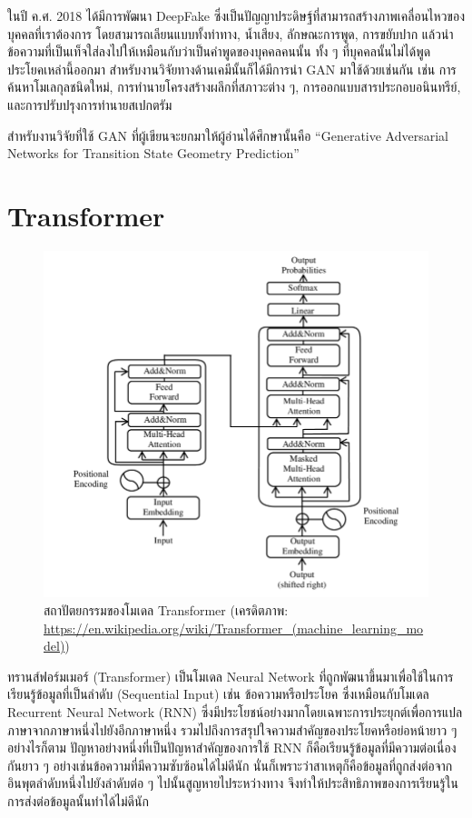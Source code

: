 ในปี ค.ศ. 2018 ได้มีการพัฒนา DeepFake ซึ่งเป็นปัญญาประดิษฐ์ที่สามารถสร้างภาพเคลื่อนไหวของบุคคลที่เราต้องการ โดยสามารถเลียนแบบทั้งท่าทาง, น้ำเสียง, ลักษณะการพูด, การขยับปาก แล้วนำข้อความที่เป็นเท็จใส่ลงไปให้เหมือนกับว่าเป็นคำพูดของบุคคลคนนั้น ทั้ง ๆ ที่บุคคลนั้นไม่ได้พูดประโยคเหล่านี้ออกมา สำหรับงานวิจัยทางด้านเคมีนั้นก็ได้มีการนำ GAN มาใช้ด้วยเช่นกัน เช่น การค้นหาโมเลกุลชนิดใหม่\autocite{prykhodko2019,lee2021,blanchard2021}, การทำนายโครงสร้างผลึกที่สภาวะต่าง ๆ\autocite{kim2020}, การออกแบบสารประกอบอนินทรีย์\autocite{dan2020}, และการปรับปรุงการทำนายสเปกตรัม\autocite{al-mualem2022}

สำหรับงานวิจัยที่ใช้ GAN ที่ผู้เขียนจะยกมาให้ผู้อ่านได้ศึกษานั้นคือ \enquote{Generative Adversarial Networks for Transition State Geometry Prediction}\autocite{makos2021}

\section{Transformer}
\label{sec:transformer}

\begin{figure}[H]
    \centering
    \includegraphics[width=0.9\linewidth]{fig/transformer.png}
    \caption{สถาปัตยกรรมของโมเดล Transformer (เครดิตภาพ: \url{https://en.wikipedia.org/wiki/Transformer_(machine_learning_model)})}
    \label{fig:transformer}
\end{figure}

ทรานส์ฟอร์มเมอร์ (Transformer)\autocite{vaswani2017a} เป็นโมเดล Neural Network ที่ถูกพัฒนาขึ้นมาเพื่อใช้ในการเรียนรู้ข้อมูลที่เป็นลำดับ (Sequential Input) เช่น ข้อความหรือประโยค ซึ่งเหมือนกับโมเดล Recurrent Neural Network (RNN) ซึ่งมีประโยชน์อย่างมากโดยเฉพาะการประยุกต์เพื่อการแปลภาษาจากภาษาหนึ่งไปยังอีกภาษาหนึ่ง รวมไปถึงการสรุปใจความสำคัญของประโยคหรือย่อหน้ายาว ๆ อย่างไรก็ตาม ปัญหาอย่างหนึ่งที่เป็นปัญหาสำคัญของการใช้ RNN ก็คือเรียนรู้ข้อมูลที่มีความต่อเนื่องกันยาว ๆ อย่างเช่นข้อความที่มีความซับซ้อนได้ไม่ดีนัก นั่นก็เพราะว่าสาเหตุก็คือข้อมูลที่ถูกส่งต่อจากอินพุตลำดับหนึ่งไปยังลำดับต่อ ๆ ไปนั้นสูญหายไประหว่างทาง จึงทำให้ประสิทธิภาพของการเรียนรู้ในการส่งต่อข้อมูลนั้นทำได้ไม่ดีนัก

